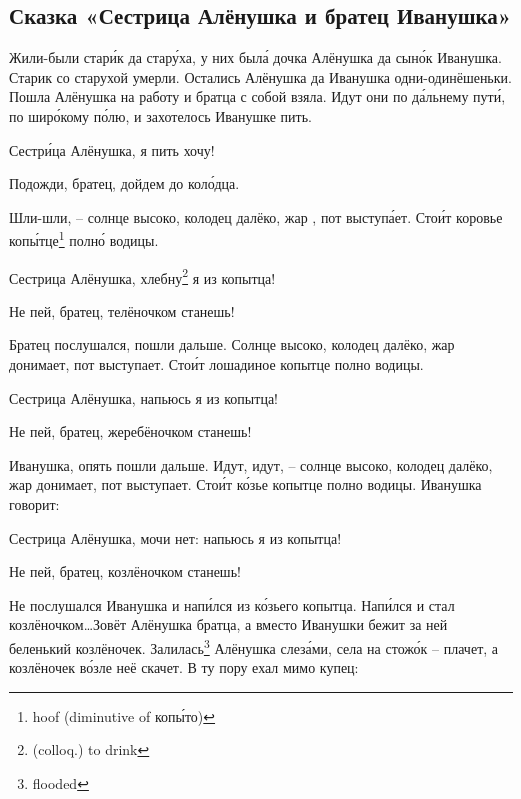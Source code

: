 \subsection{Сказка «Сестрица Алёнушка и братец Иванушка»}
Жили-были стар\'{и}к да стар\'{у}ха, у них был\'{а} дочка Алёнушка да сын\'{о}к Иванушка. Старик со старухой умерли. Остались Алёнушка да Иванушка одни-одинёшеньки. Пошла Алёнушка на работу и братца с собой взяла. Идут они по д\'{а}льнему пут\'{и}, по шир\'{о}кому п\'{о}лю, и захотелось Иванушке пить.
%
\begin{dialogue}
    \item Сестр\'{и}ца Алёнушка, я пить хочу!
    \item Подожди, братец, дойдем до кол\'{о}дца.
\end{dialogue}
%
Шли-шли, -- солнце высоко, колодец далёко, жар , пот выступ\'{а}ет. Сто\'{и}т коровье коп\'{ы}тце\footnote{hoof (diminutive of коп\'{ы}то)} полн\'{о} водицы.
%
\begin{dialogue}
    \item Сестрица Алёнушка, хлебну\footnote{(colloq.) to drink} я из копытца!
    \item Не пей, братец, телёночком станешь!
\end{dialogue}
%
Братец послушался, пошли дальше. Солнце высоко, колодец далёко, жар донимает, пот выступает. Сто\'{и}т лошадиное копытце полно водицы.
%
\begin{dialogue}
    \item Сестрица Алёнушка, напьюсь я из копытца!
    \item Не пей, братец, жеребёночком станешь!
\end{dialogue}
%
 Иванушка, опять пошли дальше. Идут, идут, -- солнце высоко, колодец далёко, жар донимает, пот выступает. Сто\'{и}т к\'{о}зье копытце полно водицы. Иванушка говорит:
%
\begin{dialogue}
    \item  Сестрица Алёнушка, мочи нет: напьюсь я из копытца!
    \item  Не пей, братец, козлёночком станешь!
\end{dialogue}
%
Не послушался Иванушка и нап\'{и}лся из к\'{о}зьего копытца. Нап\'{и}лся и стал козлёночком\dots Зовёт Алёнушка братца, а вместо Иванушки бежит за ней беленький козлёночек. Залилась\footnote{flooded} Алёнушка слез\'{а}ми, села на стож\'{о}к -- плачет, а козлёночек в\'{о}зле неё скачет. В ту пору ехал мимо купец:

